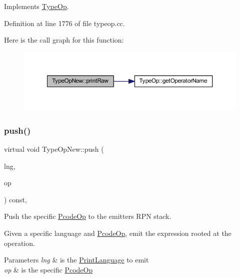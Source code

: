 Implements \mbox{\hyperlink{class_type_op_a60717e486917a30cc7cb6e3ce02585e1}{Type\+Op}}.



Definition at line 1776 of file typeop.\+cc.

Here is the call graph for this function\+:
\nopagebreak
\begin{figure}[H]
\begin{center}
\leavevmode
\includegraphics[width=350pt]{class_type_op_new_aa227f62ca7c9a75fd62ecc2932e3d746_cgraph}
\end{center}
\end{figure}
\mbox{\label{class_type_op_new_afd623815d8c19c3cdd8e1d3d439e932c}} 
\subsubsection{\texorpdfstring{push()}{push()}}
{\footnotesize\ttfamily virtual void Type\+Op\+New\+::push (\begin{DoxyParamCaption}\item[{\mbox{\hyperlink{class_print_language}{Print\+Language}} $\ast$}]{lng,  }\item[{const \mbox{\hyperlink{class_pcode_op}{Pcode\+Op}} $\ast$}]{op }\end{DoxyParamCaption}) const\hspace{0.3cm}{\ttfamily [inline]}, {\ttfamily [virtual]}}



Push the specific \mbox{\hyperlink{class_pcode_op}{Pcode\+Op}} to the emitter\textquotesingle{}s R\+PN stack. 

Given a specific language and \mbox{\hyperlink{class_pcode_op}{Pcode\+Op}}, emit the expression rooted at the operation. 
\begin{DoxyParams}{Parameters}
{\em lng} & is the \mbox{\hyperlink{class_print_language}{Print\+Language}} to emit \\
\hline
{\em op} & is the specific \mbox{\hyperlink{class_pcode_op}{Pcode\+Op}} \\
\hline
\end{DoxyParams}


